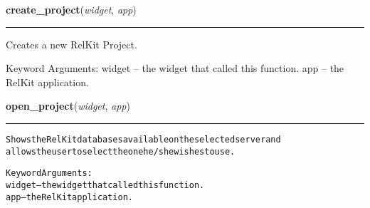     \label{reliafree:utilities:create_project}

    \vspace{0.5ex}

\hspace{.8\funcindent}\begin{boxedminipage}{\funcwidth}

    \raggedright \textbf{create\_project}(\textit{widget}, \textit{app})

    \vspace{-1.5ex}

    \rule{\textwidth}{0.5\fboxrule}
\setlength{\parskip}{2ex}
    Creates a new RelKit Project.

    Keyword Arguments: widget -- the widget that called this function. app
    -- the RelKit application.

\setlength{\parskip}{1ex}
    \end{boxedminipage}

    \label{reliafree:utilities:open_project}

    \vspace{0.5ex}

\hspace{.8\funcindent}\begin{boxedminipage}{\funcwidth}

    \raggedright \textbf{open\_project}(\textit{widget}, \textit{app})

    \vspace{-1.5ex}

    \rule{\textwidth}{0.5\fboxrule}
\setlength{\parskip}{2ex}
\begin{alltt}
Shows the RelKit databases available on the selected server and
allows the user to select the one he/she wishes to use.

Keyword Arguments:
widget -- the widget that called this function.
   app -- the RelKit application.
\end{alltt}

\setlength{\parskip}{1ex}
    \end{boxedminipage}

    \label{reliafree:utilities:save_project}

